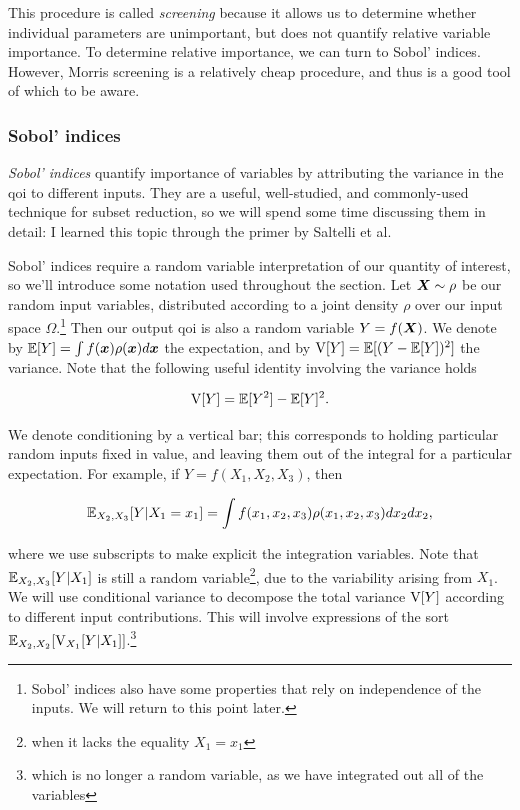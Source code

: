 \documentclass{article}
\begin{document}
This procedure is called \emph{screening} because it allows us to determine
whether individual parameters are unimportant, but does not quantify relative
variable importance. To determine relative importance, we can turn to Sobol'
indices. However, Morris screening is a relatively cheap procedure, and thus is
a good tool of which to be aware.

\subsubsection{Sobol' indices}
\emph{Sobol' indices} quantify importance of variables by attributing the
variance in the qoi to different inputs. They are a useful, well-studied, and
commonly-used technique for subset reduction, so we will spend some time
discussing them in detail: I learned this topic through the primer by Saltelli
et al.\cite{saltelli2004sensitivity}

Sobol' indices require a random variable interpretation of our quantity of
interest, so we'll introduce some notation used throughout the section. Let
\(\boldsymbol{X}\sim\rho\) be our random input variables, distributed according to a joint
density \(\rho\) over our input space \(\Omega\).\footnote{Sobol' indices also
  have some properties that rely on independence of the inputs. We will return
  to this point later.} Then our output qoi is also a random variable
\(Y=f(\boldsymbol{X})\). We denote by \(\mathbb{E}[Y] = \int f(\boldsymbol{x})\rho(\boldsymbol{x})d\boldsymbol{x}\) the expectation,
and by \(\mathrm{V}[Y]=\mathbb{E}[(Y-\mathbb{E}[Y])^2]\) the variance. Note that the following useful
identity involving the variance holds

\begin{equation}
  \mathrm{V}[Y] = \mathbb{E}[Y^2] - \mathbb{E}[Y]^2.
\end{equation}

We denote conditioning by a vertical bar; this corresponds to holding particular
random inputs fixed in value, and leaving them out of the integral for a
particular expectation. For example, if \(Y=f(X_1,X_2,X_3)\), then

\begin{equation}
  \mathbb{E}_{X_2,X_3}[Y|X_1=x_1] = \int f(x_1,x_2,x_3)\rho(x_1,x_2,x_3)dx_2dx_2,
\end{equation}

\noindent where we use subscripts to make explicit the integration variables.
Note that \(\mathbb{E}_{X_2,X_3}[Y|X_1]\) is still a random variable\footnote{when it
  lacks the equality \(X_1=x_1\)}, due to the variability arising from \(X_1\).
We will use conditional variance to decompose the total variance \(\mathrm{V}[Y]\)
according to different input contributions. This will involve expressions of the
sort \(\mathbb{E}_{X_2,X_2}[\mathrm{V}_{X_1}[Y|X_1]]\).\footnote{which is no longer a random
  variable, as we have integrated out all of the variables}
\end{document}
